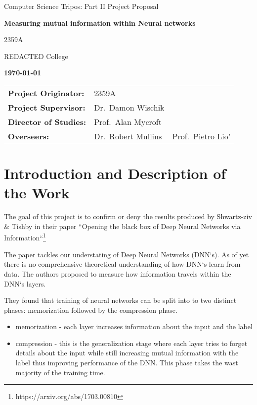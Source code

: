 \documentclass[12pt]{article}
\begin{document}


\thispagestyle{empty}

\centerline{\large Computer Science Tripos: Part II Project Proposal}
\vspace{0.4in}
\centerline{\Large\bf Measuring mutual information within Neural networks}
\vspace{0.3in}

\centerline{2359A}
\centerline{REDACTED College}

\centerline{\large \textbf{\today}}

\vspace{1in}

\begin{tabular}{ p{4cm} p{4.5cm} l }
{\bf Project Originator:} & 2359A & \\[3mm]
{\bf Project Supervisor:} & Dr.\ Damon Wischik \\[3mm]
{\bf Director of Studies:} & Prof.\ Alan Mycroft \\[3mm]
{\bf Overseers:} & Dr.\ Robert Mullins & Prof.\ Pietro Lio' \\[3mm]
\end{tabular}

\vspace{0.75in}

\section*{Introduction and Description of the Work}

The goal of this project is to confirm or deny the results produced by
Shwartz-ziv \& Tishby in their paper ``Opening the black box of Deep Neural
Networks via Information``\footnote{https://arxiv.org/abs/1703.00810}

The paper tackles our understating of Deep Neural Networks (DNN`s). As of yet
there is no comprehensive theoretical understanding of how DNN`s learn from data.
The authors proposed to measure how information travels within the DNN`s layers.

They found that training of neural networks can be split into to two distinct
phases: memorization followed by the compression phase.
\begin{itemize}
  \item memorization - each layer increases information about the input and the
    label
  \item compression  - this is the generalization stage where each layer tries
    to forget details about the input while still increasing mutual information
    with the label thus improving performance of the DNN. This phase takes the
    wast majority of the training time.
\end{itemize}
\end{document}
